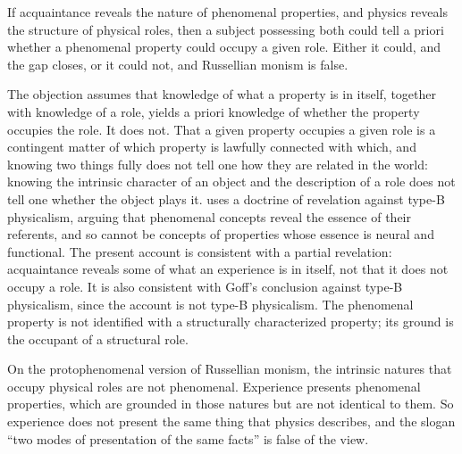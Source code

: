 \documentclass{situationist-preprint}
\begin{document}
\begin{objection}[Revelation]\label{o:revelation}
If acquaintance reveals the nature of phenomenal properties, and physics reveals the structure of physical roles, then a subject possessing both could tell a priori whether a phenomenal property could occupy a given role. Either it could, and the gap closes, or it could not, and Russellian monism is false.
\end{objection}

\begin{reply}
The objection assumes that knowledge of what a property is in itself, together with knowledge of a role, yields a priori knowledge of whether the property occupies the role. It does not. That a given property occupies a given role is a contingent matter of which property is lawfully connected with which, and knowing two things fully does not tell one how they are related in the world: knowing the intrinsic character of an object and the description of a role does not tell one whether the object plays it. \citet{Goff2017} uses a doctrine of revelation against type-B physicalism, arguing that phenomenal concepts reveal the essence of their referents, and so cannot be concepts of properties whose essence is neural and functional. The present account is consistent with a partial revelation: acquaintance reveals some of what an experience is in itself, not that it does not occupy a role. It is also consistent with Goff's conclusion against type-B physicalism, since the account is not type-B physicalism. The phenomenal property is not identified with a structurally characterized property; its ground is the occupant of a structural role.
\end{reply}

\begin{objection}\label{o:ground}
On the protophenomenal version of Russellian monism, the intrinsic natures that occupy physical roles are not phenomenal. Experience presents phenomenal properties, which are grounded in those natures but are not identical to them. So experience does not present the same thing that physics describes, and the slogan \enquote{two modes of presentation of the same facts} is false of the view.
\end{objection}
\end{document}

